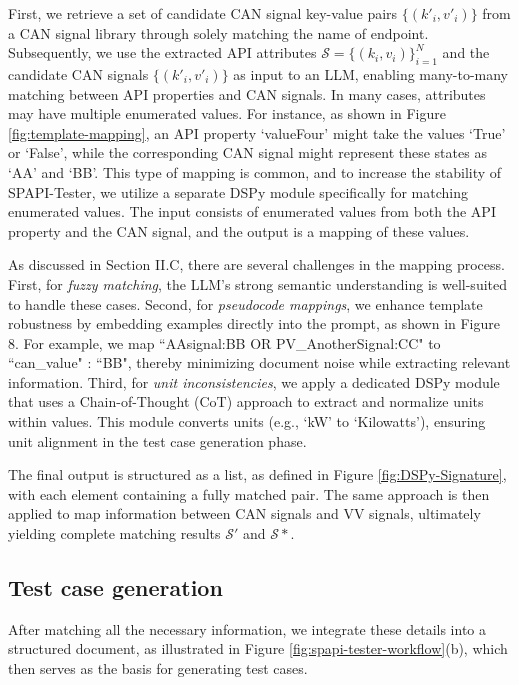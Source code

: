 First, we retrieve a set of candidate CAN signal key-value pairs \(\{(k'_i, v'_i)\}\) from a CAN signal library through solely matching the name of endpoint. Subsequently, we use the extracted API attributes \(\mathcal{S} = \{(k_i, v_i)\}_{i=1}^N\) and the candidate CAN signals \(\{(k'_i, v'_i)\}\) as input to an LLM, enabling many-to-many matching between API properties and CAN signals. In many cases, attributes may have multiple enumerated values. For instance, as shown in Figure \ref{fig:template-mapping}, an API property `valueFour' might take the values `True' or `False', while the corresponding CAN signal might represent these states as `AA' and `BB'. This type of mapping is common, and to increase the stability of SPAPI-Tester, we utilize a separate DSPy module specifically for matching enumerated values. The input consists of enumerated values from both the API property and the CAN signal, and the output is a mapping of these values.

As discussed in Section II.C, there are several challenges in the mapping process. First, for \textit{fuzzy matching}, the LLM’s strong semantic understanding is well-suited to handle these cases. Second, for \textit{pseudocode mappings}, we enhance template robustness by embedding examples directly into the prompt, as shown in Figure 8. For example, we map ``AAsignal:BB OR PV\_AnotherSignal:CC" to ``can\_value" : ``BB", thereby minimizing document noise while extracting relevant information. Third, for \textit{unit inconsistencies}, we apply a dedicated DSPy module that uses a Chain-of-Thought (CoT) approach to extract and normalize units within values. This module converts units (e.g., `kW' to `Kilowatts'), ensuring unit alignment in the test case generation phase.

The final output is structured as a list, as defined in Figure \ref{fig:DSPy-Signature}, with each element containing a fully matched pair. The same approach is then applied to map information between CAN signals and VV signals, ultimately yielding complete matching results \(\mathcal{S'}\) and \(\mathcal{S*}\).

\subsection{Test case generation}

After matching all the necessary information, we integrate these details into a structured document, as illustrated in Figure \ref{fig:spapi-tester-workflow}(b), which then serves as the basis for generating test cases.

